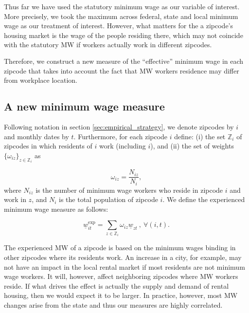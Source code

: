 
Thus far we have used the statutory minimum wage as our variable of interest. More 
precisely, we took the maximum across federal, state and local minimum wage as our 
treatment of interest. However, what matters for the a zipcode's housing market is 
the wage of the people residing there, which may not coincide with the statutory MW
if workers actually work in different zipcodes.

Therefore, we construct a new measure of the ``effective'' minimum wage in each zipcode 
that takes into account the fact that MW workers residence may differ from workplace 
location.



\subsection{A new minimum wage measure}

Following notation in section \autoref{sec:empirical_strategy}, we denote zipcodes by $i$
and monthly dates by $t$. Furthermore, for each zipcode $i$ define: (i) the set $\mathds{Z}_i$
of zipcodes in which residents of $i$ work (including $i$), and (ii) the set of weights 
$\{\omega_{iz}\}_{z \in \mathds{Z}_i}$ as 

\begin{equation*} \label{eq:weights}
	\omega_{iz} = \frac{N_{iz}}{N_i} ,
\end{equation*}
where $N_{iz}$ is the number of minimum wage workers who reside in zipcode $i$ and work in 
$z$, and $N_i$ is the total population of zipcode $i$. We define the experienced minimum 
wage measure as follows:

\begin{equation}
	\underline{w}^{\text{exp}}_{it} = \sum_{z \in \mathds{Z}_i} \omega_{iz} \underline{w}_{zt} \ 
	, \ \forall (i, t) . 
\end{equation}

The experienced MW of a zipcode is based on the minimum wages binding in other zipcodes where 
its residents work. An increase in a city, for example, may not have an impact in the local
rental market if most residents are not minimum wage workers. It will, however, affect 
neighboring zipcodes where MW workers reside. If what drives the effect is actually the supply
and demand of rental housing, then we would expect it to be larger. In practice, however, 
most MW changes arise from the state and thus our measures are highly correlated.

